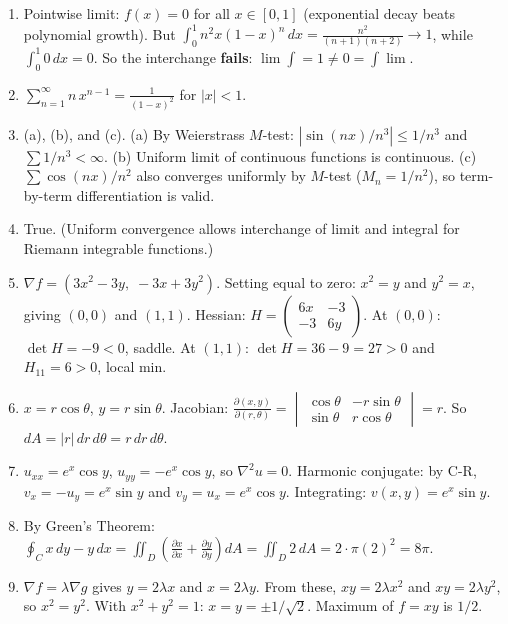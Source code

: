 \documentclass[11pt]{article}
\begin{document}
\begin{enumerate}
\item Pointwise limit: $f(x)=0$ for all $x\in[0,1]$ (exponential decay beats polynomial growth). But $\int_0^1 n^2 x(1-x)^n\,dx = \frac{n^2}{(n+1)(n+2)} \to 1$, while $\int_0^1 0\,dx = 0$. So the interchange \textbf{fails}: $\lim\int = 1 \neq 0 = \int\lim$.

\item $\displaystyle\sum_{n=1}^{\infty}n\,x^{n-1} = \frac{1}{(1-x)^2}$ for $|x|<1$.

\item (a), (b), and (c). \quad (a) By Weierstrass $M$-test: $|\sin(nx)/n^3|\le 1/n^3$ and $\sum 1/n^3<\infty$. (b) Uniform limit of continuous functions is continuous. (c) $\sum\cos(nx)/n^2$ also converges uniformly by $M$-test ($M_n=1/n^2$), so term-by-term differentiation is valid.

\item True. (Uniform convergence allows interchange of limit and integral for Riemann integrable functions.)

\item $\nabla f = (3x^2-3y,\;-3x+3y^2)$. Setting equal to zero: $x^2=y$ and $y^2=x$, giving $(0,0)$ and $(1,1)$. Hessian: $H=\begin{pmatrix}6x&-3\\-3&6y\end{pmatrix}$. At $(0,0)$: $\det H = -9<0$, saddle. At $(1,1)$: $\det H = 36-9=27>0$ and $H_{11}=6>0$, local min.

\item $x=r\cos\theta$, $y=r\sin\theta$. Jacobian: $\frac{\partial(x,y)}{\partial(r,\theta)}=\begin{vmatrix}\cos\theta & -r\sin\theta\\ \sin\theta & r\cos\theta\end{vmatrix}=r$. So $dA=|r|\,dr\,d\theta = r\,dr\,d\theta$.

\item $u_{xx}=e^x\cos y$, $u_{yy}=-e^x\cos y$, so $\nabla^2 u=0$. Harmonic conjugate: by C-R, $v_x=-u_y=e^x\sin y$ and $v_y=u_x=e^x\cos y$. Integrating: $v(x,y)=e^x\sin y$.

\item By Green's Theorem: $\oint_C x\,dy-y\,dx = \iint_D\left(\frac{\partial x}{\partial x}+\frac{\partial y}{\partial y}\right)dA = \iint_D 2\,dA = 2\cdot\pi(2)^2=8\pi$.

\item $\nabla f = \lambda\nabla g$ gives $y=2\lambda x$ and $x=2\lambda y$. From these, $xy = 2\lambda x^2$ and $xy=2\lambda y^2$, so $x^2=y^2$. With $x^2+y^2=1$: $x=y=\pm 1/\sqrt{2}$. Maximum of $f=xy$ is $\boxed{1/2}$.
\end{enumerate}
\end{document}
